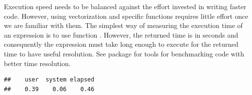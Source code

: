 \documentclass[krantz2]{krantz}\usepackage{knitr}
\begin{document}
Execution speed needs to be balanced against the effort invested in writing faster code. However, using vectorization and specific \Rlang functions requires little effort once we are familiar with them. The simplest way of measuring the execution time of an \Rlang expression is to use function . However, the returned time is in seconds and consequently the expression must take long enough to execute for the returned time to have useful resolution. See package  for tools for benchmarking code with better time resolution.

\begin{knitrout}\footnotesize
{}\color{fgcolor}\begin{kframe}
\begin{alltt}
 \hlkwb{<-} \hlstd{()}
               \hlopt{:}\hlstd{) \{}
               \hlkwb{<-}  \hlopt{/} 
              \hlstd{\}}
            \hlstd{\})}
\end{alltt}
\begin{verbatim}
##    user  system elapsed
##    0.39    0.06    0.46
\end{verbatim}
\end{kframe}
\end{knitrout}
\end{document}
